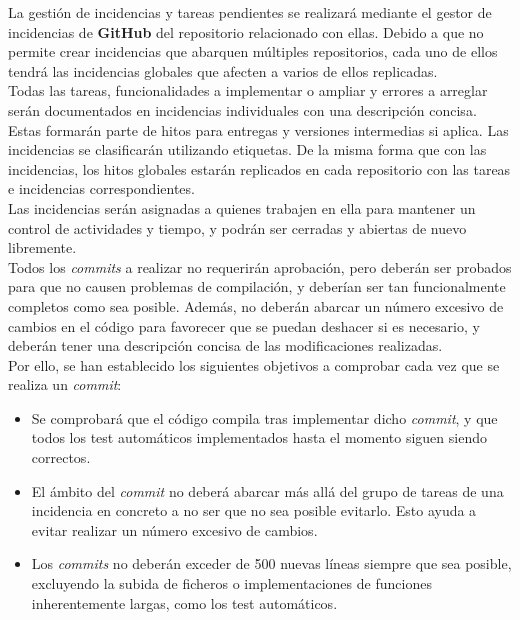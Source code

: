 \documentclass[11pt, a4paper, titlepage]{article}
\begin{document}
La gestión de incidencias y tareas pendientes se realizará mediante el gestor de incidencias de \textbf{GitHub} del repositorio relacionado con ellas. Debido a que no permite crear incidencias que abarquen múltiples repositorios, cada uno de ellos tendrá las incidencias globales que afecten a varios de ellos replicadas. \\

Todas las tareas, funcionalidades a implementar o ampliar y errores a arreglar serán documentados en incidencias individuales con una descripción concisa. Estas formarán parte de hitos para entregas y versiones intermedias si aplica. Las incidencias se clasificarán utilizando etiquetas. De la misma forma que con las incidencias, los hitos globales estarán replicados en cada repositorio con las tareas e incidencias correspondientes. \\

Las incidencias serán asignadas a quienes trabajen en ella para mantener un control de actividades y tiempo, y podrán ser cerradas y abiertas de nuevo libremente. \\

Todos los \textit{commits} a realizar no requerirán aprobación, pero deberán ser probados para que no causen problemas de compilación, y deberían ser tan funcionalmente completos como sea posible. Además, no deberán abarcar un número excesivo de cambios en el código para favorecer que se puedan deshacer si es necesario, y deberán tener una descripción concisa de las modificaciones realizadas. \\

Por ello, se han establecido los siguientes objetivos a comprobar cada vez que se realiza un \textit{commit}:
\begin{itemize}
    \item Se comprobará que el código compila tras implementar dicho \textit{commit}, y que todos los test automáticos implementados hasta el momento siguen siendo correctos.
    \item El ámbito del \textit{commit} no deberá abarcar más allá del grupo de tareas de una incidencia en concreto a no ser que no sea posible evitarlo. Esto ayuda a evitar realizar un número excesivo de cambios.
    \item Los \textit{commits} no deberán exceder de 500 nuevas líneas siempre que sea posible, excluyendo la subida de ficheros o implementaciones de funciones inherentemente largas, como los test automáticos.
\end{itemize}
\end{document}
